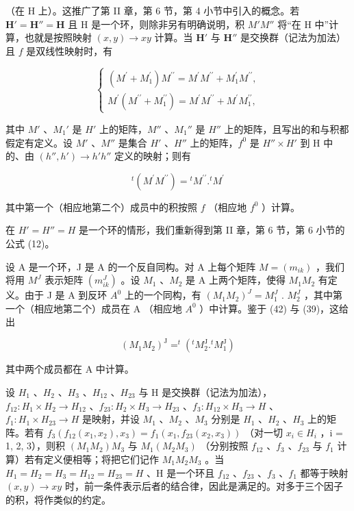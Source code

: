 （在 H 上）。这推广了第 II 章，第 6 节，第 4 小节中引入的概念。若 \(\mathbf{H}' = \mathbf{H}'' = \mathbf{H}\) 且 H 是一个环，则除非另有明确说明，积 \(M'M''\) 将“在 H 中”计算，也就是按照映射 \((x, y) \to xy\) 计算。当 \(\mathbf{H}'\) 与 \(\mathbf{H}''\) 是交换群（记法为加法）且 \(f\) 是双线性映射时，有

\[
\left\{ \begin{array}{l} (M ^ {\prime} + M _ {1} ^ {\prime}) M ^ {\prime \prime} = M ^ {\prime} M ^ {\prime \prime} + M _ {1} ^ {\prime} M ^ {\prime \prime}, \\ M ^ {\prime} (M ^ {\prime \prime} + M _ {1} ^ {\prime \prime}) = M ^ {\prime} M ^ {\prime \prime} + M ^ {\prime} M _ {1} ^ {\prime \prime}, \end{array} \right.\tag{41}
\]

其中 \(M'\) 、\(M_1'\) 是 \(H'\) 上的矩阵，\(M''\) 、\(M_1''\) 是 \(H''\) 上的矩阵，且写出的和与积都假定有定义。设 \(M'\) 、\(M''\) 是集合 \(H'\) 、\(H''\) 上的矩阵，\(f^0\) 是 \(H'' \times H'\) 到 H 中的、由 \((h'', h') \to h' h''\) 定义的映射；则有

\[
{ } ^ { t } ( M ^ { \prime } M ^ { \prime \prime } ) = { } ^ { t } M ^ { \prime \prime } . { } ^ { t } M ^ { \prime }\tag{42}
\]

其中第一个（相应地第二个）成员中的积按照 \(f\) （相应地 \(f^{0}\) ）计算。

在 \(H' = H'' = H\) 是一个环的情形，我们重新得到第 II 章，第 6 节，第 6 小节的公式 (12)。

设 A 是一个环，J 是 A 的一个反自同构。对 A 上每个矩阵 \(M = (m_{ik})\) ，我们将用 \(M^{J}\) 表示矩阵 \((m_{ik}^{J})\) 。设 \(M_{1}\) 、\(M_{2}\) 是 A 上两个矩阵，使得 \(M_{1}M_{2}\) 有定义。由于 J 是 A 到反环 \(A^{0}\) 上的一个同构，有 \((M_{1}M_{2})^{J} = M_{1}^{J}\) . \(M_{2}^{J}\) ，其中第一个（相应地第二个）成员在 A （相应地 \(A^{0}\) ）中计算。鉴于 (42) 与 (39)，这给出

\[
(M _ {1} M _ {2}) ^ {\mathrm{J}} = ^ {t} (^ {t} M _ {2} ^ {\mathrm{J}}. ^ {t} M _ {1} ^ {\mathrm{J}})\tag{43}
\]

其中两个成员都在 A 中计算。

设 \(H_{1}\) 、\(H_{2}\) 、\(H_{3}\) 、\(H_{12}\) 、\(H_{23}\) 与 H 是交换群（记法为加法），\(f_{12}: H_{1} \times H_{2} \to H_{12}\) 、\(f_{23}: H_{2} \times H_{3} \to H_{23}\) 、\(f_{3}: H_{12} \times H_{3} \to H\) 、\(f_{1}: H_{1} \times H_{23} \to H\) 是映射，并设 \(M_{1}\) 、\(M_{2}\) 、\(M_{3}\) 分别是 \(H_{1}\) 、\(H_{2}\) 、\(H_{3}\) 上的矩阵。若有 \(f_{3}(f_{12}(x_{1}, x_{2}), x_{3}) = f_{1}(x_{1}, f_{23}(x_{2}, x_{3}))\) （对一切 \(x_{i} \in H_{i}\) ，i = 1, 2, 3），则积 \((M_{1}M_{2})M_{3}\) 与 \(M_{1}(M_{2}M_{3})\) （分别按照 \(f_{12}\) 、\(f_{3}\) 、\(f_{23}\) 与 \(f_{1}\) 计算）若有定义便相等；将把它们记作 \(M_{1}M_{2}M_{3}\) 。当 \(H_{1} = H_{2} = H_{3} = H_{12} = H_{23} = H\) 、H 是一个环且 \(f_{12}\) 、\(f_{23}\) 、\(f_{3}\) 、\(f_{1}\) 都等于映射 \((x, y) \to xy\) 时，前一条件表示后者的结合律，因此是满足的。对多于三个因子的积，将作类似的约定。

